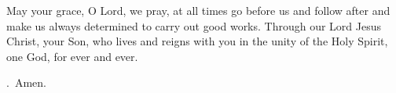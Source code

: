 \lettrine[lines=3]{M}{}ay your grace, O Lord, we pray, at all times go before us and follow after and make us always determined to carry out good works. Through our Lord Jesus Christ, your Son, who lives and reigns with you in the unity of the Holy Spirit, one God, for ever and ever. \par \Rbar.~Amen.
